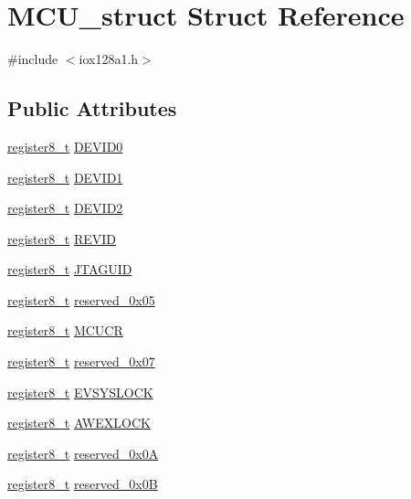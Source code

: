 \hypertarget{struct_m_c_u__struct}{
\section{MCU\_\-struct Struct Reference}
\label{struct_m_c_u__struct}
}


{\ttfamily \#include $<$iox128a1.h$>$}

\subsection*{Public Attributes}
\begin{DoxyCompactItemize}
\item 
\hyperlink{iox128a1_8h_a6a0649252b392263406882923b04a9db}{register8\_\-t} \hyperlink{struct_m_c_u__struct_ab8d62789898e31f6356ee2f797ffc18e}{DEVID0}
\item 
\hyperlink{iox128a1_8h_a6a0649252b392263406882923b04a9db}{register8\_\-t} \hyperlink{struct_m_c_u__struct_a1b901c61c8910324709fd7ce29d4dc8c}{DEVID1}
\item 
\hyperlink{iox128a1_8h_a6a0649252b392263406882923b04a9db}{register8\_\-t} \hyperlink{struct_m_c_u__struct_a0d7e65f42906cfdce10cd1dfb3f0e89e}{DEVID2}
\item 
\hyperlink{iox128a1_8h_a6a0649252b392263406882923b04a9db}{register8\_\-t} \hyperlink{struct_m_c_u__struct_a88e3c48004744d44ddce07f8773a80f9}{REVID}
\item 
\hyperlink{iox128a1_8h_a6a0649252b392263406882923b04a9db}{register8\_\-t} \hyperlink{struct_m_c_u__struct_ab075dbf965d4c42ed5dfa355ac73d350}{JTAGUID}
\item 
\hyperlink{iox128a1_8h_a6a0649252b392263406882923b04a9db}{register8\_\-t} \hyperlink{struct_m_c_u__struct_a4d84d15f87954e40fee299f0d0b7df9a}{reserved\_\-0x05}
\item 
\hyperlink{iox128a1_8h_a6a0649252b392263406882923b04a9db}{register8\_\-t} \hyperlink{struct_m_c_u__struct_a0b3a8da42bb1e3f9331e0497a3720268}{MCUCR}
\item 
\hyperlink{iox128a1_8h_a6a0649252b392263406882923b04a9db}{register8\_\-t} \hyperlink{struct_m_c_u__struct_a4ff5da78997c21c3adae9f741694ac15}{reserved\_\-0x07}
\item 
\hyperlink{iox128a1_8h_a6a0649252b392263406882923b04a9db}{register8\_\-t} \hyperlink{struct_m_c_u__struct_addef5ef11df1d8e4ea3b4bd65f0809c1}{EVSYSLOCK}
\item 
\hyperlink{iox128a1_8h_a6a0649252b392263406882923b04a9db}{register8\_\-t} \hyperlink{struct_m_c_u__struct_a25043851a658a15513404de60e29ab24}{AWEXLOCK}
\item 
\hyperlink{iox128a1_8h_a6a0649252b392263406882923b04a9db}{register8\_\-t} \hyperlink{struct_m_c_u__struct_a3bc1309f84f8a8bb4e1e090596152bae}{reserved\_\-0x0A}
\item 
\hyperlink{iox128a1_8h_a6a0649252b392263406882923b04a9db}{register8\_\-t} \hyperlink{struct_m_c_u__struct_aa0d8450ddd757697248d3782d4f72b9a}{reserved\_\-0x0B}
\end{DoxyCompactItemize}


